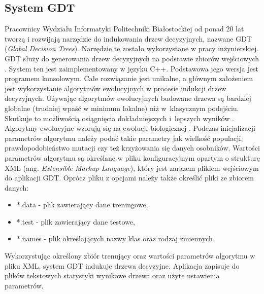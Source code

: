 \subsection{System GDT}
Pracownicy Wydziału Informatyki Politechniki Białostockiej od ponad 20 lat tworzą i rozwijają narzędzie do indukowania drzew decyzyjnych, nazwane GDT (\textit{Global Decision Trees}). Narzędzie te zostało wykorzystane w pracy inżynierskiej. GDT służy do generowania drzew decyzyjnych na podstawie zbiorów wejściowych \cite{sgdt_1}. System ten jest zaimplementowany w języku C++. Podstawowa jego wersja jest programem konsolowym. Całe rozwiązanie jest unikalne, a głównym założeniem jest wykorzystanie algorytmów ewolucyjnych w procesie indukcji drzew decyzyjnych. Używając algorytmów ewolucyjnych budowane drzewa są bardziej globalne (trudniej wpaść w minimum lokalne) niż w~klasycznym podejściu. Skutkuje to możliwością osiągnięcia dokładniejszych i~lepszych wyników \cite{sgdt_2}. Algorytmy ewolucyjne wzorują się na ewolucji biologicznej \cite{book_2}. Podczas inicjalizacji parametrów algorytmu należy podać takie parametry jak wielkość populacji, prawdopodobieństwo mutacji czy też krzyżowania się danych osobników. Wartości parametrów algorytmu są określane w pliku konfiguracyjnym opartym o strukturę XML (ang. \textit{Extensible Markup Language}), który jest zarazem plikiem wejściowym do aplikacji GDT. Oprócz pliku z opcjami należy także określić pliki ze zbiorem danych:
\begin{itemize}
	\item *.data - plik zawierający dane treningowe, 
	\item *.test - plik zawierający dane testowe,
	\item *.names - plik określających nazwy klas oraz rodzaj zmiennych.
\end{itemize}
Wykorzystując  określony zbiór trenujący oraz wartości parametrów algorytmu w pliku XML, system GDT indukuje drzewa decyzyjne. Aplikacja zapisuje do plików tekstowych statystyki wynikowe drzewa oraz użyte ustawienia parametrów.


